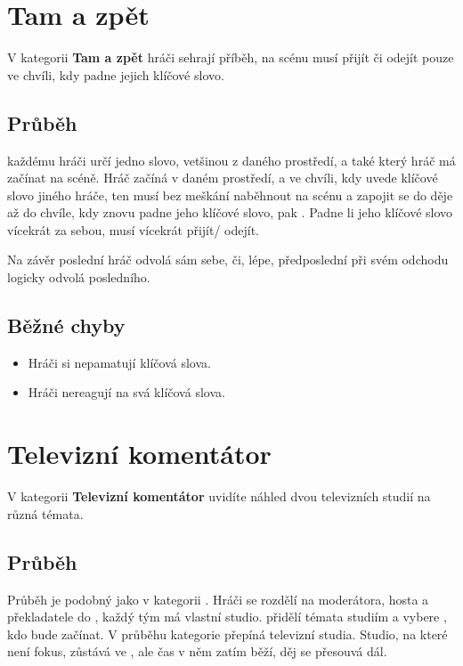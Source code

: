 \documentclass[main.tex]{subfiles}
\begin{document}
 
 
 
\needspace{5cm} \section{Tam a zpět} \label{tam a zpět}  
 
 
V kategorii \textbf{Tam a zpět}{} hráči sehrají příběh, na scénu musí přijít či odejít pouze ve chvíli, kdy padne jejich klíčové slovo. 
 
 
\subsection{Průběh}  každému hráči určí jedno slovo, vetšinou z daného prostředí, a také který hráč má začínat na scéně. 
Hráč začíná v daném prostředí, a ve chvíli, kdy uvede klíčové slovo jiného hráče, ten musí bez meškání naběhnout na scénu a zapojit se do děje až do chvíle, kdy znovu padne jeho klíčové slovo, pak . Padne li jeho klíčové slovo vícekrát za sebou, musí vícekrát přijít/ odejít. 
 
Na závěr poslední hráč odvolá sám sebe, či, lépe, předposlední při svém odchodu logicky odvolá posledního. 
 
\subsection{ Běžné chyby } \begin{itemize}
\item Hráči si nepamatují klíčová slova.
\item Hráči nereagují na svá klíčová slova.
\end{itemize}
 
 
 
 
 
\needspace{5cm} \section{Televizní komentátor} \label{televizní komentátor}  
 
V kategorii \textbf{Televizní komentátor}{} uvidíte náhled dvou televizních studií na různá témata. 
 
\subsection{ Průběh } Průběh je podobný jako v kategorii . Hráči se rozdělí na moderátora, hosta a překladatele do , každý tým má vlastní studio.  přidělí témata studiím a vybere , kdo bude začínat. V průběhu kategorie  přepíná televizní studia. 
Studio, na které není fokus, zůstává ve , ale čas v něm zatím běží, děj se přesouvá dál. 
 
\end{document}
